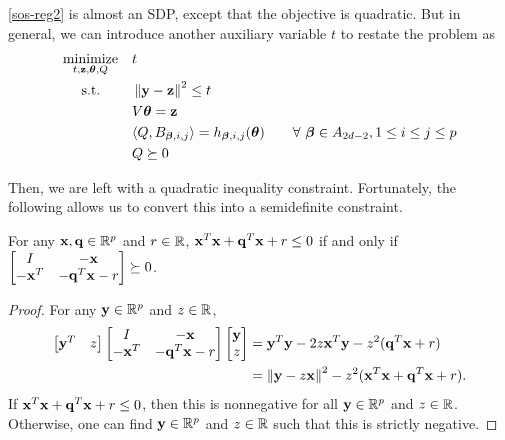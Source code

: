 \documentclass[11pt]{article}
\begin{document}
\eqref{sos-reg2} is almost an SDP, except that the objective is quadratic. But in general, we can introduce another auxiliary variable $t$ to restate the problem as
\begin{equation}\label{sos-reg3}
\begin{aligned}
& \underset{t, {\bf z}, {\boldsymbol\theta}, Q}{\text{minimize}}
& & t \\
& \text{\quad\ s.t.}
& & \left\lVert {\bf y}-{\bf z} \right\rVert^2 \leq t \\
& & & V{\boldsymbol\theta} = {\bf z} \\
& & & \langle{Q, B_{{\boldsymbol\beta}, i, j}} \rangle = h_{{\boldsymbol\beta}, i, j}({\boldsymbol\theta}) \qquad \forall\ {\boldsymbol\beta} \in A_{2d - 2}, 1 \le i \le j \le p \\
& & & Q \succeq 0 
\end{aligned}
\end{equation}

Then, we are left with a quadratic inequality constraint. Fortunately, the following allows us to convert this into a semidefinite constraint.
\begin{lemma}
For any ${\bf x}, {\bf q} \in {\mathbb R}^p$ and $r \in {\mathbb R}$, ${\bf x}^T{\bf x} + {\bf q}^T{\bf x} + r \leq 0$ if and only if $\begin{bmatrix} I & -{\bf x} \\ -{\bf x}^T & -{\bf q}^T{\bf x} - r \end{bmatrix} \succeq 0$.
\end{lemma}
\begin{proof}
For any ${\bf y} \in {\mathbb R}^p$ and $z \in {\mathbb R}$, 
\begin{align*}
\begin{bmatrix} {\bf y}^T & z \end{bmatrix} \begin{bmatrix} I & -{\bf x} \\ -{\bf x}^T & -{\bf q}^T{\bf x} - r \end{bmatrix} \begin{bmatrix} {\bf y} \\ z \end{bmatrix} &= {\bf y}^T{\bf y} -2z{\bf x}^T{\bf y} - z^2({\bf q}^T{\bf x}+r) \\
&= \left\lVert {\bf y} - z{\bf x} \right\rVert^2 - z^2({\bf x}^T{\bf x} + {\bf q}^T{\bf x} + r).
\end{align*}
If ${\bf x}^T{\bf x} + {\bf q}^T{\bf x} + r \leq 0$, then this is nonnegative for all ${\bf y} \in {\mathbb R}^p$ and $z \in {\mathbb R}$. Otherwise, one can find ${\bf y} \in {\mathbb R}^p$ and $z \in {\mathbb R}$ such that this is strictly negative.
\end{proof}
\end{document}
